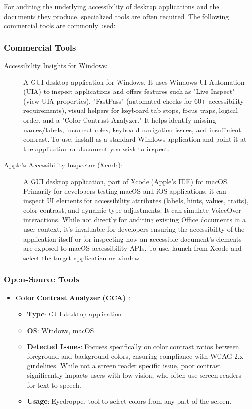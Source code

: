 For auditing the underlying accessibility of desktop applications and the documents they produce, specialized tools are often required. The following commercial tools are commonly used:

\subsubsection{Commercial Tools}
\label{subsubsec:commercial-desktop-tools}
\begin{description}
    \item[Accessibility Insights for Windows:] \cite{InsightsWindows} A GUI desktop application for Windows. It uses Windows UI Automation (UIA) to inspect applications and offers features such as "Live Inspect" (view UIA properties), "FastPass" (automated checks for 60+ accessibility requirements), visual helpers for keyboard tab stops, focus traps, logical order, and a "Color Contrast Analyzer." It helps identify missing names/labels, incorrect roles, keyboard navigation issues, and insufficient contrast. To use, install as a standard Windows application and point it at the application or document you wish to inspect.
    \item[Apple's Accessibility Inspector (Xcode):] \cite{AppleInspector} A GUI desktop application, part of Xcode (Apple's IDE) for macOS. Primarily for developers testing macOS and iOS applications, it can inspect UI elements for accessibility attributes (labels, hints, values, traits), color contrast, and dynamic type adjustments. It can simulate VoiceOver interactions. While not directly for auditing existing Office documents in a user context, it's invaluable for developers ensuring the accessibility of the application itself or for inspecting how an accessible document's elements are exposed to macOS accessibility APIs. To use, launch from Xcode and select the target application or window.
\end{description}

\subsubsection{Open-Source Tools}
\begin{itemize}
    \item \textbf{Color Contrast Analyzer (CCA)} \cite{CCA}:
        \begin{itemize}
            \item \textbf{Type}: GUI desktop application.
            \item \textbf{OS}: Windows, macOS.
            \item \textbf{Detected Issues}: Focuses specifically on color contrast ratios between foreground and background colors, ensuring compliance with WCAG 2.x guidelines. While not a screen reader specific issue, poor contrast significantly impacts users with low vision, who often use screen readers for text-to-speech.
            \item \textbf{Usage}: Eyedropper tool to select colors from any part of the screen.
        \end{itemize}
\end{itemize}

